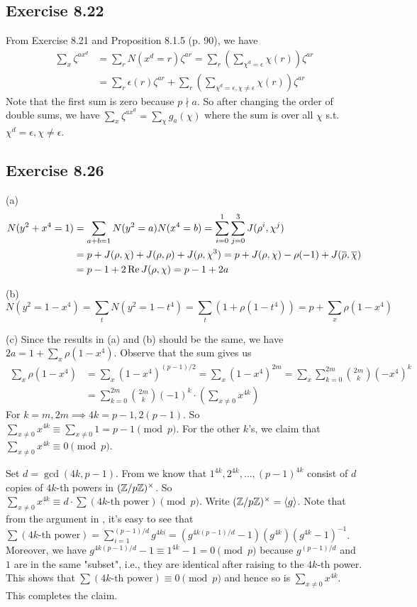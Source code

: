 \documentclass[../I&R.tex]{subfiles}
\begin{document}
\subsection*{Exercise 8.22}

From Exercise 8.21 and Proposition 8.1.5 (p. 90), we have
\begin{align*}
    \sum_x \zeta^{ax^d} &= \sum_r N(x^d=r)\zeta^{ar} = \sum_r \left(\sum_{\chi^d=\epsilon} \chi(r)\right)\zeta^{ar} \\
    &= \sum_r \epsilon(r)\zeta^{ar} + \sum_r\left(\sum_{\chi^d=\epsilon,\chi\neq\epsilon} \chi(r)\right)\zeta^{ar}
\end{align*}
Note that the first sum is zero because $p\nmid a$. So after changing the order of double sums, we have $\sum_x \zeta^{ax^d} = \sum_\chi g_a(\chi)$ where the sum is over all $\chi$ s.t. $\chi^d=\epsilon,\chi\neq\epsilon$.

\subsection*{Exercise 8.26}

(a) \begin{align*}
    N(y^2+x^4=1) &= \sum_{a+b=1} N(y^2=a)N(x^4=b) = \sum_{i=0}^1\sum_{j=0}^3 J(\rho^i,\chi^j) \\
    &= p+J(\rho,\chi)+J(\rho,\rho)+J(\rho,\chi^3) = p+J(\rho,\chi)-\rho(-1)+J(\overline{\rho},\overline{\chi}) \\
    &= p-1+2\operatorname{Re} J(\rho,\chi) = p-1+2a
\end{align*}

(b) $$N(y^2=1-x^4) = \sum_t N(y^2=1-t^4) = \sum _t (1+\rho(1-t^4)) = p+\sum_x \rho(1-x^4)$$

(c) Since the results in (a) and (b) should be the same, we have $2a=1+\sum_x \rho(1-x^4)$. Observe that the sum gives us
\begin{align*}
    \sum_x \rho(1-x^4) &= \sum_x (1-x^4)^{(p-1)/2} = \sum_x (1-x^4)^{2m} = \sum_x \sum_{k=0}^{2m} \binom{2m}{k}(-x^4)^k \\
    &= \sum_{k=0}^{2m}\binom{2m}{k}(-1)^k\cdot\left(\sum_{x\neq0} x^{4k}\right)
\end{align*}
For $k=m,2m\implies 4k=p-1,2(p-1)$. So $\sum_{x\neq0} x^{4k}\equiv\sum_{x\neq0} 1 = p-1 \pmod{p}$. For the other $k$'s, we claim that $\sum_{x\neq0} x^{4k}\equiv0\pmod{p}$.

Set $d=\gcd(4k,p-1)$. From  we know that $1^{4k},2^{4k},\ldots,(p-1)^{4k}$ consist of $d$ copies of $4k$-th powers in $(\mathbb{Z}/p\mathbb{Z})^\times$. So $\sum_{x\neq0} x^{4k}\equiv d\cdot\sum (4k\text{-th power}) \pmod{p}$. Write $(\mathbb{Z}/p\mathbb{Z})^\times=\langle g\rangle$. Note that from the argument in , it's easy to see that $\sum (4k\text{-th power}) = \sum_{i=1}^{(p-1)/d} g^{4ki} = (g^{4k(p-1)/d}-1)(g^{4k})(g^{4k}-1)^{-1}$. Moreover, we have $g^{4k(p-1)/d}-1\equiv 1^{4k}-1=0\pmod{p}$ because $g^{(p-1)/d}$ and $1$ are in the same "subset", i.e., they are identical after raising to the $4k$-th power. This shows that $\sum (4k\text{-th power}) \equiv0\pmod{p}$ and hence so is $\sum_{x\neq0} x^{4k}$. This completes the claim.
\end{document}
